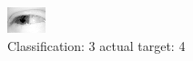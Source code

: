 \begin{figure}[h!]
\begin{center}
\includegraphics[width=0.60\columnwidth]{figures/ID2512_class_3_target_4.png}
\end{center}
\caption{ Classification: 3 actual target: 4}
\label{fig:ID2512_class_3_target_4}
\end{figure}

